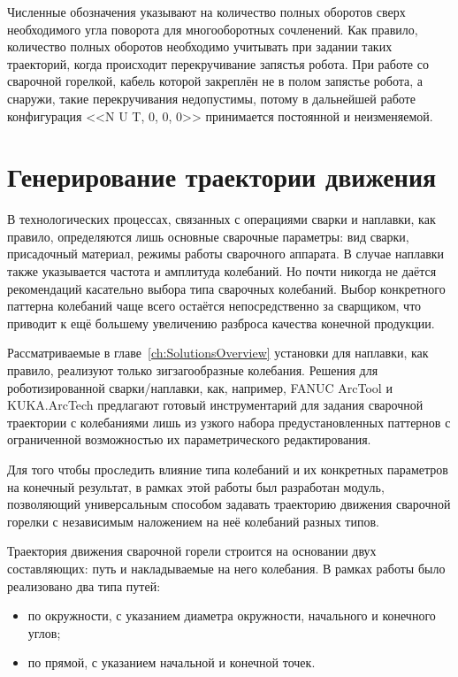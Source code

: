 Численные обозначения указывают на количество полных оборотов сверх необходимого угла поворота для многооборотных сочленений.
Как правило, количество полных оборотов необходимо учитывать при задании таких траекторий, когда происходит перекручивание запястья робота.
При работе со сварочной горелкой, кабель которой закреплён не в полом запястье робота, а снаружи, такие перекручивания недопустимы, потому в дальнейшей работе конфигурация <<N U T, 0, 0, 0>> принимается постоянной и неизменяемой.


\section{Генерирование траектории движения}
В технологических процессах, связанных с операциями сварки и наплавки, как правило, определяются лишь основные сварочные параметры: вид сварки, присадочный материал, режимы работы сварочного аппарата.
В случае наплавки также указывается частота и амплитуда колебаний.
Но почти никогда не даётся рекомендаций касательно выбора типа сварочных колебаний.
Выбор конкретного паттерна колебаний чаще всего остаётся непосредственно за сварщиком, что приводит к ещё большему увеличению разброса качества конечной продукции.

Рассматриваемые в главе~\ref{ch:SolutionsOverview} установки для наплавки, как правило, реализуют только зигзагообразные колебания.
Решения для роботизированной сварки/наплавки, как, например, FANUC ArcTool и KUKA.ArcTech предлагают готовый инструментарий для задания сварочной траектории с колебаниями лишь из узкого набора предустановленных паттернов с ограниченной возможностью их параметрического редактирования.

Для того чтобы проследить влияние типа колебаний и их конкретных параметров на конечный результат, в рамках этой работы был разработан модуль, позволяющий универсальным способом задавать траекторию движения сварочной горелки с независимым наложением на неё колебаний разных типов.


Траектория движения сварочной горели строится на основании двух составляющих: путь и накладываемые на него колебания.
В рамках работы было реализовано два типа путей:

\begin{itemize}
    \item по окружности, с указанием диаметра окружности, начального и конечного углов;
    \item по прямой, с указанием начальной и конечной точек.
\end{itemize}

